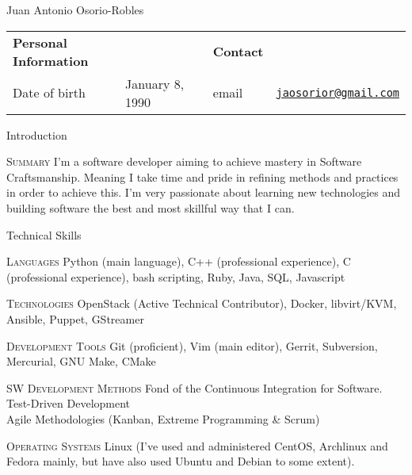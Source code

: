\documentclass[english,10pt,letterpaper]{article}
\begin{document}
\centering
\begin{cv}{Juan Antonio Osorio-Robles}

	\begin{table}[h]
		\begin{tabular}{@{} l l p{0.5cm} l r}
			{\bf Personal Information}	&	&	&	{\bf Contact}	&\\
			Date of birth &	January 8, 1990	&	&
			email & \href{mailto:jaosorior@gmail.com}{\tt jaosorior@gmail.com}\\
		\end{tabular}
	\end{table}

	\begin{cvlist}{Introduction}
        \item[\textsc{Summary}]
            I'm a software developer aiming to achieve mastery in Software
            Craftsmanship. Meaning I take time and pride in refining
            methods and practices in order to achieve this. I'm very passionate
            about learning new technologies and building software the best and
            most skillful way that I can.
	\end{cvlist}


	\begin{cvlist}{Technical Skills}
			\item [\textsc{Languages}]
                Python (main language), C++ (professional experience), C
                (professional experience), bash scripting, Ruby, Java, SQL,
                Javascript
			\item [\textsc{Technologies}]
                OpenStack (Active Technical Contributor), Docker, libvirt/KVM,
                Ansible, Puppet, GStreamer
			\item [\textsc{Development Tools}]
                Git (proficient), Vim (main editor), Gerrit, Subversion,
                Mercurial, GNU Make, CMake
			\item [\textsc{SW Development Methods}]
				Fond of the Continuous Integration for Software.\\
                Test-Driven Development\\
                Agile Methodologies (Kanban, Extreme Programming \& Scrum)
			\item [\textsc{Operating Systems}]
                Linux (I've used and administered CentOS, Archlinux and Fedora
                mainly, but have also used Ubuntu and Debian to some extent).
	\end{cvlist}


\end{cv}
\end{document}
